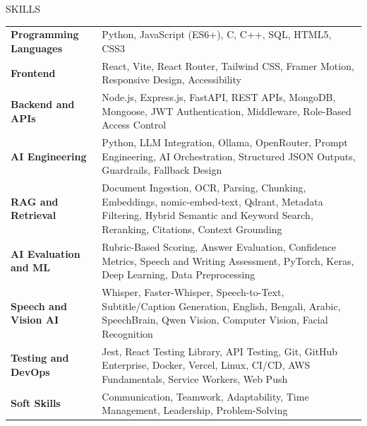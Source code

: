 \documentclass{resume}
\begin{document}
\begin{rSection}{SKILLS}

\begin{tabular}{ @{} >{\bfseries}l @{\hspace{3ex}} p{} }
Programming Languages & Python, JavaScript (ES6+), C, C++, SQL, HTML5, CSS3 \\
Frontend & React, Vite, React Router, Tailwind CSS, Framer Motion, Responsive Design, Accessibility \\
Backend and APIs & Node.js, Express.js, FastAPI, REST APIs, MongoDB, Mongoose, JWT Authentication, Middleware, Role-Based Access Control \\
AI Engineering & Python, LLM Integration, Ollama, OpenRouter, Prompt Engineering, AI Orchestration, Structured JSON Outputs, Guardrails, Fallback Design \\
RAG and Retrieval & Document Ingestion, OCR, Parsing, Chunking, Embeddings, nomic-embed-text, Qdrant, Metadata Filtering, Hybrid Semantic and Keyword Search, Reranking, Citations, Context Grounding \\
AI Evaluation and ML & Rubric-Based Scoring, Answer Evaluation, Confidence Metrics, Speech and Writing Assessment, PyTorch, Keras, Deep Learning, Data Preprocessing \\
Speech and Vision AI & Whisper, Faster-Whisper, Speech-to-Text, Subtitle/Caption Generation, English, Bengali, Arabic, SpeechBrain, Qwen Vision, Computer Vision, Facial Recognition \\
Testing and DevOps & Jest, React Testing Library, API Testing, Git, GitHub Enterprise, Docker, Vercel, Linux, CI/CD, AWS Fundamentals, Service Workers, Web Push \\
Soft Skills & Communication, Teamwork, Adaptability, Time Management, Leadership, Problem-Solving \\
\end{tabular}

\end{rSection}

\end{document}
